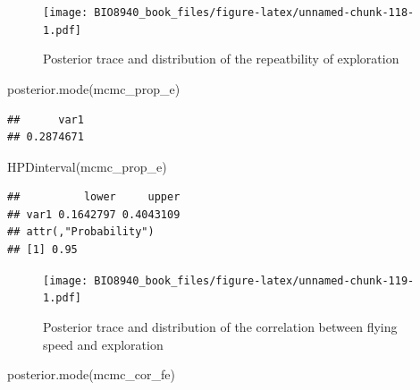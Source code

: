 \documentclass[
  12pt,
]{book}
\newenvironment{Shaded}{\begin{snugshade}}{\end{snugshade}}
\newcommand{\DecValTok}[1]{\textcolor[rgb]{0.00,0.00,0.81}{#1}}
\newcommand{\FunctionTok}[1]{\textcolor[rgb]{0.00,0.00,0.00}{#1}}
\newcommand{\NormalTok}[1]{#1}
\newcommand{\OtherTok}[1]{\textcolor[rgb]{0.56,0.35,0.01}{#1}}
\newcommand{\SpecialCharTok}[1]{\textcolor[rgb]{0.00,0.00,0.00}{#1}}
\begin{document}
\begin{figure}
\centering
\texttt{[image: BIO8940\_book\_files/figure-latex/unnamed-chunk-118-1.pdf]}
\caption{\label{fig:unnamed-chunk-118}Posterior trace and distribution of the repeatbility of exploration}
\end{figure}

\begin{Shaded}
\begin{Highlighting}[]
\FunctionTok{posterior.mode}\NormalTok{(mcmc\_prop\_e)}
\end{Highlighting}
\end{Shaded}

\begin{verbatim}
##      var1 
## 0.2874671
\end{verbatim}

\begin{Shaded}
\begin{Highlighting}[]
\FunctionTok{HPDinterval}\NormalTok{(mcmc\_prop\_e)}
\end{Highlighting}
\end{Shaded}

\begin{verbatim}
##          lower     upper
## var1 0.1642797 0.4043109
## attr(,"Probability")
## [1] 0.95
\end{verbatim}

\begin{Shaded}
\end{Shaded}

\begin{figure}
\centering
\texttt{[image: BIO8940\_book\_files/figure-latex/unnamed-chunk-119-1.pdf]}
\caption{\label{fig:unnamed-chunk-119}Posterior trace and distribution of the correlation between flying speed and exploration}
\end{figure}

\begin{Shaded}
\begin{Highlighting}[]
\FunctionTok{posterior.mode}\NormalTok{(mcmc\_cor\_fe)}
\end{Highlighting}
\end{Shaded}
\end{document}
